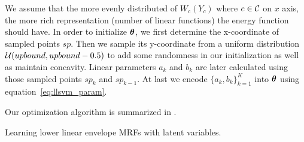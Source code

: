We assume that the more evenly distributed of $W_c(Y_c)$ where
$c\in{\cal C}$ on $x$ axis, the more rich representation (number of
linear functions) the energy function should have. In order to
initialize $\boldsymbol{\theta}$, we first determine the x-coordinate of
sampled points $sp$. Then we sample its y-coordinate from a
uniform distribution ${\cal U}(upbound,upbound-0.5)$ to add some
randomness in our initialization as well as maintain concavity.
Linear parameters $a_k$ and $b_k$ are later calculated using
those sampled points $sp_k$ and $sp_{k-1}$. At last we encode
$\{a_k,b_k\}_{k=1}^K$ into $\boldsymbol{\theta}$ using
equation~\eqref{eq:llsvm_param}.

Our optimization algorithm is summarized in
.

\begin{algorithm}[hb]
  \begin{algorithmic}[1]
    \REPEAT
    \ENDFOR

    \REPEAT


    \ENDIF
    \ENDFOR

  \end{algorithmic}
  \caption{\label{alg:learning} Learning lower linear envelope
    MRFs with latent variables.}
\end{algorithm}



\clearpage
\cleardoublepage



